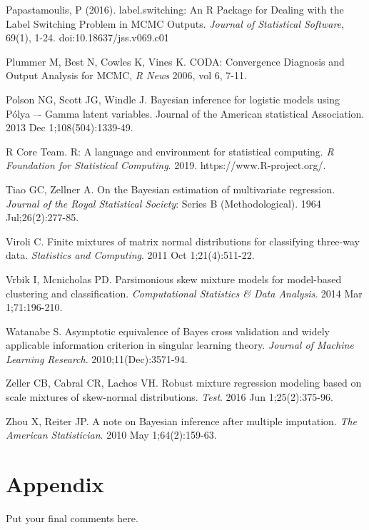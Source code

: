\documentclass[useAMS,referee]{biom}
\begin{document}
\begin{thebibliography}{}
\bibitem{ } Papastamoulis, P (2016). label.switching: An R Package for Dealing with the Label Switching Problem in MCMC Outputs. \textit{Journal of Statistical Software}, 69(1), 1-24. doi:10.18637/jss.v069.c01

\bibitem{} Plummer M, Best N, Cowles K, Vines K. CODA: Convergence Diagnosis and Output Analysis for MCMC, \textit{R News} 2006, vol 6, 7-11.

\bibitem{ } Polson NG, Scott JG, Windle J. Bayesian inference for logistic models using P\'olya –- Gamma latent variables. Journal of the American statistical Association. 2013 Dec 1;108(504):1339-49.

\bibitem{ } R Core Team. R: A language and environment for statistical computing. \textit{R Foundation for Statistical Computing}. 2019. https://www.R-project.org/.

\bibitem{ } Tiao GC, Zellner A. On the Bayesian estimation of multivariate regression. \textit{Journal of the Royal Statistical Society}: Series B (Methodological). 1964 Jul;26(2):277-85.

\bibitem{ } Viroli C. Finite mixtures of matrix normal distributions for classifying three-way data. \textit{Statistics and Computing}. 2011 Oct 1;21(4):511-22.

\bibitem{ } Vrbik I, Mcnicholas PD. Parsimonious skew mixture models for model-based clustering and classification. \textit{Computational Statistics \& Data Analysis}. 2014 Mar 1;71:196-210.

\bibitem{ } Watanabe S. Asymptotic equivalence of Bayes cross validation and widely applicable information criterion in singular learning theory. \textit{Journal of Machine Learning Research}. 2010;11(Dec):3571-94.

\bibitem{ } Zeller CB, Cabral CR, Lachos VH. Robust mixture regression modeling based on scale mixtures of skew-normal distributions. \textit{Test}. 2016 Jun 1;25(2):375-96.

\bibitem{ } Zhou X, Reiter JP. A note on Bayesian inference after multiple imputation. \textit{The American Statistician}. 2010 May 1;64(2):159-63.

\end{thebibliography}

\section{Appendix}

Put your final comments here. 
\end{document}
